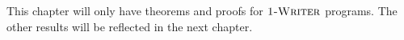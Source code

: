 




 This chapter will only have theorems and proofs for $\textsc{1-Writer}$ programs. The other results will be reflected in the next chapter. 
